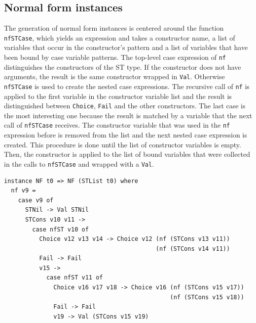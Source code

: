 \documentclass[a4paper, 11pt, fleqn]{scrreprt}
\newcommand{\cinline}[1]{\texttt{#1}}
\begin{document}
\subsection{Normal form instances}
The generation of normal form instances is centered around the function \cinline{nfSTCase}, which yields an expression and takes a constructor name, a list of variables that occur in the constructor's pattern and a list of variables that have been bound by case variable patterns. The top-level case expression of \cinline{nf} distinguishes the constructors of the ST type. If the constructor does not have arguments, the result is the same constructor wrapped in \cinline{Val}. Otherwise \cinline{nfSTCase} is used to create the nested case expressions. The recursive call of \cinline{nf} is applied to the first variable in the constructor variable list and the result is distinguished between \cinline{Choice}, \cinline{Fail} and the other constructors.
The last case is the most interesting one because the result is matched by a variable that the next call of \cinline{nfSTCase} receives. The constructor variable that was used in the \cinline{nf} expression before is removed from the list and the next nested case expression is created. This procedure is done until the list of constructor variables is empty. Then, the constructor is applied to the list of bound variables that were collected in the calls to \cinline{nfSTCase} and wrapped with a \cinline{Val}.
\begin{verbatim}
instance NF t0 => NF (STList t0) where
  nf v9 =
    case v9 of
      STNil -> Val STNil
      STCons v10 v11 ->
        case nfST v10 of
          Choice v12 v13 v14 -> Choice v12 (nf (STCons v13 v11))
                                           (nf (STCons v14 v11))
          Fail -> Fail
          v15 ->
            case nfST v11 of
              Choice v16 v17 v18 -> Choice v16 (nf (STCons v15 v17))
                                               (nf (STCons v15 v18))
              Fail -> Fail
              v19 -> Val (STCons v15 v19)
\end{verbatim}
\end{document}
